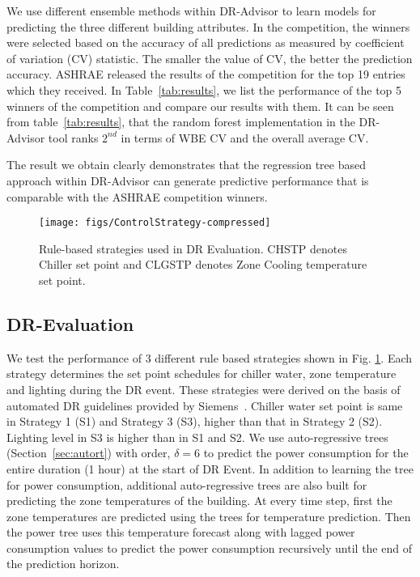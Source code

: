 \documentclass{sig-alternate-ipsn13}
\theoremstyle{definition}
\begin{document}
We use different ensemble methods within DR-Advisor to learn models for predicting the three different building attributes. 
In the competition, the winners were selected based on the accuracy of all predictions as measured by coefficient of variation (CV) statistic. 
The smaller the value of CV, the better the prediction accuracy.
ASHRAE released the results of the competition for the top 19 entries which they received. 
In Table~\ref{tab:results}, we list the performance of the top 5 winners of the competition and compare our results with them.
It can be seen from table~\ref{tab:results}, that the random forest implementation in the DR-Advisor tool ranks $2^{nd}$ in terms of WBE CV and the overall average CV. 

The result we obtain clearly demonstrates that the regression tree based approach within DR-Advisor can generate predictive performance that is comparable with the ASHRAE competition winners. 

\begin{figure}[b]
\centering
\texttt{[image: figs/ControlStrategy-compressed]}
\caption{Rule-based strategies used in DR Evaluation. CHSTP denotes Chiller set point and CLGSTP denotes Zone Cooling temperature set point. }
\label{fig:case_eval_control}
\vspace{-10pt}
\end{figure}

\subsection{DR-Evaluation}
\label{sec:case_eval}

We test the performance of 3 different rule based strategies shown in Fig. \ref{fig:case_eval_control}. 
Each strategy determines the set point schedules for chiller water, zone temperature and lighting during the DR event. 
These strategies were derived on the basis of automated DR guidelines provided by Siemens~\cite{siemensdr}.
Chiller water set point is same in Strategy 1 (S1) and Strategy 3 (S3), higher than that in Strategy 2 (S2). Lighting level in S3 is higher than in S1 and S2.
We use auto-regressive trees (Section~\ref{sec:autort}) with order, $\delta = 6$ to predict the power consumption for the entire duration (1 hour) at the start of DR Event. In addition to learning the tree for power consumption, additional auto-regressive trees are also built for predicting the zone temperatures of the building.
At every time step, first the zone temperatures are predicted using the trees for temperature prediction. 
Then the power tree uses this temperature forecast along with lagged power consumption values to predict the power consumption recursively until the end of the prediction horizon.
\end{document}
